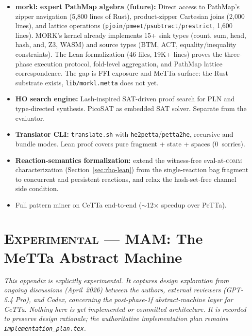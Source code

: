 \documentclass[11pt]{article}
\newcommand{\code}[1]{\texttt{#1}}
\newcommand{\PeTTa}{\textup{PeTTa}}
\newcommand{\CeTTa}{\textup{CeTTa}}
\newcommand{\PathMap}{\textup{PathMap}}
\begin{document}
\begin{itemize}
\item \textbf{morkl: expert \PathMap{} algebra (future):}  Direct access to
  \PathMap{}'s zipper navigation (5{,}800 lines of Rust), product-zipper
  Cartesian joins (2{,}000 lines), and lattice operations
  (\code{pjoin}/\code{pmeet}/\code{psubtract}/\code{prestrict}, 1{,}600
  lines).  MORK's kernel already implements 15+ sink types (count, sum, head,
  hash, and, Z3, WASM) and source types (BTM, ACT, equality/inequality
  constraints).  The Lean formalization (46 files, 19K+ lines) proves the
  three-phase execution protocol, fold-level aggregation, and \PathMap{}
  lattice correspondence.  The gap is FFI exposure and MeTTa surface: the
  Rust substrate exists, \code{lib/morkl.metta} does not yet.
\item \textbf{HO search engine:} Lash-inspired SAT-driven proof
  search for PLN and type-directed synthesis.  PicoSAT as
  embedded SAT solver.  Separate from the evaluator.
\item \textbf{Translator CLI:} \code{translate.sh} with
  \code{he2petta}/\code{petta2he}, recursive and bundle modes.
  Lean proof covers pure fragment + state + spaces (0~sorries).
\item \textbf{Reaction-semantics formalization:} extend the witness-free
  eval-at-\textsc{comm} characterization (Section~\ref{sec:rho-lean}) from the
  single-reaction bag fragment to concurrent and persistent reactions, and
  relax the hash-set-free channel side condition.
\item Full pattern miner on \CeTTa{} end-to-end
  ($\sim$12$\times$ speedup over \PeTTa{}).
\end{itemize}

\appendix

\section{\textsc{Experimental} --- MAM: The MeTTa Abstract Machine}
\label{app:mam}

\emph{This appendix is explicitly experimental.  It captures design
exploration from ongoing discussions (April~2026) between the authors,
external reviewers (GPT-5.4 Pro), and Codex, concerning the
post-phase-1f abstract-machine layer for \CeTTa{}.  Nothing here is yet
implemented or committed architecture.  It is recorded to preserve
design rationale; the authoritative implementation plan remains
\code{implementation\_plan.tex}.}
\end{document}
